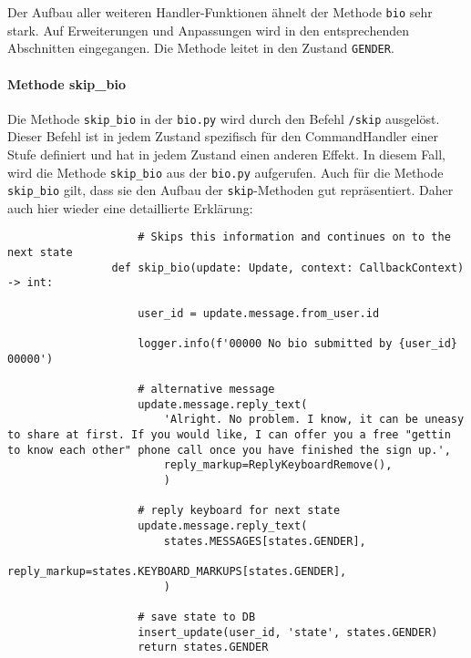                 Der Aufbau aller weiteren Handler-Funktionen ähnelt der Methode \verb|bio| sehr stark. Auf Erweiterungen und Anpassungen wird in den entsprechenden Abschnitten eingegangen. Die Methode leitet in den Zustand \verb|GENDER|.

            \paragraph{Methode skip\_bio}
                Die Methode \verb|skip_bio| in der \verb|bio.py| wird durch den Befehl \verb|/skip| ausgelöst. Dieser Befehl ist in jedem Zustand spezifisch für den CommandHandler einer Stufe definiert und hat in jedem Zustand einen anderen Effekt. In diesem Fall, wird die Methode \verb|skip_bio| aus der \verb|bio.py| aufgerufen. Auch für die Methode \verb|skip_bio| gilt, dass sie den Aufbau der \verb|skip|-Methoden gut repräsentiert. Daher auch hier wieder eine detaillierte Erklärung:\\

                \begin{verbatim}
                    # Skips this information and continues on to the next state
                def skip_bio(update: Update, context: CallbackContext) -> int:
                    
                    user_id = update.message.from_user.id

                    logger.info(f'00000 No bio submitted by {user_id} 00000')

                    # alternative message
                    update.message.reply_text(
                        'Alright. No problem. I know, it can be uneasy to share at first. If you would like, I can offer you a free "gettin to know each other" phone call once you have finished the sign up.',
                        reply_markup=ReplyKeyboardRemove(),
                        )

                    # reply keyboard for next state
                    update.message.reply_text(
                        states.MESSAGES[states.GENDER],
                        reply_markup=states.KEYBOARD_MARKUPS[states.GENDER],
                        )    

                    # save state to DB
                    insert_update(user_id, 'state', states.GENDER)
                    return states.GENDER
                
                \end{verbatim} 

